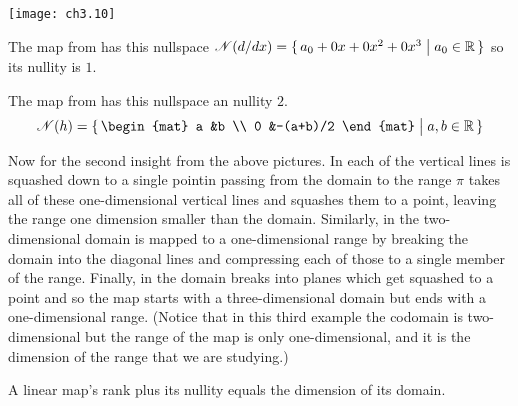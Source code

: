 \begin{center}
  \texttt{[image: ch3.10]}
\end{center}

\begin{example}
The map from  has this nullspace
\( \mathscr{N}(d/dx)=\mbox{$\{\,a_0+0x+0x^2+0x^3\bigm| a_0\in\mathbb{R}\,\}$} \)
so its nullity is $1$.
\end{example}

\begin{example}
The map from 
has this nullspace an nullity $2$.
\begin{equation*}
   \nullspace{h}=\set{\begin{mat}
                         a  &b          \\
                         0  &-(a+b)/2
                      \end{mat}\suchthat a,b\in\Re}
\end{equation*}
\end{example}

Now for the second insight from the above pictures.
In  each of the vertical lines is 
squashed down 
to a single point\Dash in passing from the domain to the range $\pi$
takes all of these one-dimensional vertical lines and squashes them
to a point, 
leaving the range one dimension smaller than the domain.
Similarly, in  the
two-dimensional domain is mapped to a one-dimensional range by breaking 
the domain into the diagonal lines 
and compressing each of those to a single member of the range.
Finally, in 
the domain breaks into planes which get
squashed to a point and so the map starts with a three-dimensional domain
but ends with a
one-dimensional range. 
(Notice that in this third example the codomain is
two-dimensional but the range of the map is only one-dimensional, and it is
the dimension of the range that we are studying.)

\begin{theorem}
\label{th:RankPlusNullEqDim}
A linear map's rank plus its nullity equals the dimension of its domain.
\end{theorem}

